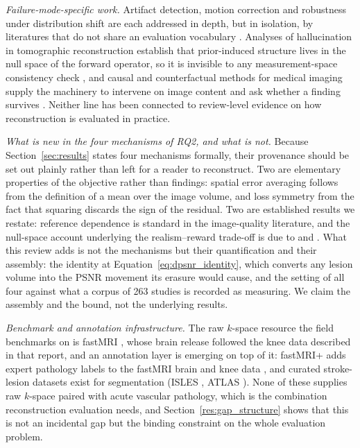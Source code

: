 \documentclass[review,authoryear]{elsarticle}
\begin{document}
\emph{Failure-mode-specific work.} Artifact detection, motion correction and robustness
under distribution shift are each addressed in depth, but in isolation, by literatures
that do not share an evaluation vocabulary
\citep{esteban2017mriqc,sommer2020correction,gngr2023adaptive}. Analyses of
hallucination in tomographic reconstruction establish that prior-induced structure lives
in the null space of the forward operator, so it is invisible to any
measurement-space consistency check
\citep{bhadra2021hallucinations,gottschling2020troublesome}, and causal and counterfactual
methods for medical imaging supply the machinery to intervene on image content and ask
whether a finding survives
\citep{pawlowski2020deep,castro2020causality,sanchez2022healthy,wei2026latent}. Neither
line has been connected to review-level evidence on how reconstruction is evaluated in
practice.

\emph{What is new in the four mechanisms of RQ2, and what is not.} Because
Section~\ref{sec:results} states four mechanisms formally, their provenance should be
set out plainly rather than left for a reader to reconstruct. Two are elementary
properties of the objective rather than findings: spatial error averaging follows from
the definition of a mean over the image volume, and loss symmetry from the fact that
squaring discards the sign of the residual. Two are established results we restate:
reference dependence is standard in the image-quality literature, and the null-space
account underlying the realism--reward trade-off is due to
\citet{bhadra2021hallucinations} and \citet{gottschling2020troublesome}. What this review adds
is not the mechanisms but their quantification and their assembly: the identity at
Equation~\eqref{eq:dpsnr_identity}, which converts any lesion volume into the PSNR
movement its erasure would cause, and the setting of all four against what a corpus of
263 studies is recorded as measuring. We claim the assembly and the bound, not the
underlying results.

\emph{Benchmark and annotation infrastructure.} The raw $k$-space resource the field
benchmarks on is fastMRI \citep{knoll2020fastmri}, whose brain release followed the knee
data described in that report, and an annotation layer is emerging
on top of it: fastMRI+ adds expert pathology labels to the fastMRI brain and knee data
\citep{zhao2022fastmriplus}, and curated stroke-lesion datasets exist for segmentation
(ISLES \citep{petzsche2022isles}, ATLAS \citep{liew2022atlas}). None of these supplies
raw $k$-space paired with acute vascular pathology, which is the combination
reconstruction evaluation needs, and Section~\ref{res:gap_structure} shows that this is
not an incidental gap but the binding constraint on the whole evaluation problem.
\end{document}
